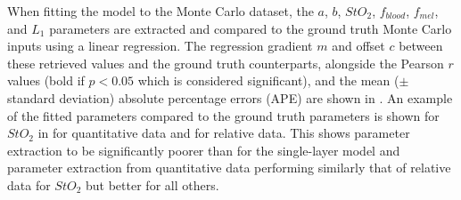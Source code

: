 When fitting the model to the Monte Carlo dataset, the $a$, $b$, $StO_2$, $f_{blood}$, $f_{mel}$, and $L_1$ parameters are extracted and compared to the ground truth Monte Carlo inputs using a linear regression. The regression gradient $m$ and offset $c$ between these retrieved values and the ground truth counterparts, alongside the Pearson $r$ values (bold if $p<0.05$ which is considered significant), and the mean ($\pm$ standard deviation) absolute percentage errors (APE) are shown in . An example of the fitted parameters compared to the ground truth parameters is shown for $StO_2$ in   for quantitative data and   for relative data. This shows parameter extraction to be significantly poorer than for the single-layer model and parameter extraction from quantitative data performing similarly that of relative data for $StO_2$ but better for all others. 
